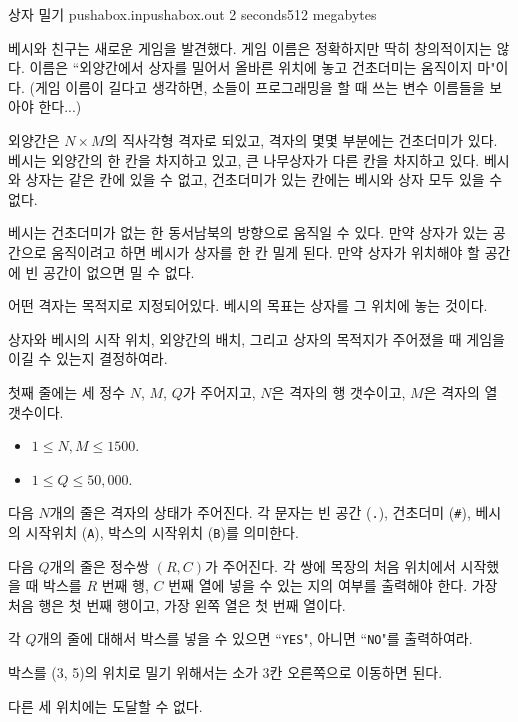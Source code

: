 \begin{problem}{상자 밀기}
	{pushabox.in}{pushabox.out}
	{2 seconds}{512 megabytes}{}
	
	베시와 친구는 새로운 게임을 발견했다. 게임 이름은 정확하지만 딱히 창의적이지는 않다. 이름은 ``외양간에서 상자를 밀어서 올바른 위치에 놓고 건초더미는 움직이지 마"이다. (게임 이름이 길다고 생각하면, 소들이 프로그래밍을 할 때 쓰는 변수 이름들을 보아야 한다...)
	
	외양간은 $N \times M$의 직사각형 격자로 되있고, 격자의 몇몇 부분에는 건초더미가 있다. 베시는 외양간의 한 칸을 차지하고 있고, 큰 나무상자가 다른 칸을 차지하고 있다. 베시와 상자는 같은 칸에 있을 수 없고, 건초더미가 있는 칸에는 베시와 상자 모두 있을 수 없다.
	
	베시는 건초더미가 없는 한 동서남북의 방향으로 움직일 수 있다. 만약 상자가 있는 공간으로 움직이려고 하면 베시가 상자를 한 칸 밀게 된다. 만약 상자가 위치해야 할 공간에 빈 공간이 없으면 밀 수 없다.
	
	어떤 격자는 목적지로 지정되어있다. 베시의 목표는 상자를 그 위치에 놓는 것이다.
	
	상자와 베시의 시작 위치, 외양간의 배치, 그리고 상자의 목적지가 주어졌을 때 게임을 이길 수 있는지 결정하여라.
	
	
	\InputFile
	
	첫째 줄에는 세 정수 $N$, $M$, $Q$가 주어지고, $N$은 격자의 행 갯수이고, $M$은 격자의 열 갯수이다.
	
	\begin{itemize}
		\item $1 \le N, M \le 1500$.
		\item $1 \le Q \le 50,000$.
	\end{itemize}
	
	다음 $N$개의 줄은 격자의 상태가 주어진다. 각 문자는 빈 공간 (\texttt{.}), 건초더미 (\texttt{\#}), 베시의 시작위치 (\texttt{A}), 박스의 시작위치 (\texttt{B})를 의미한다.
	
	다음 $Q$개의 줄은 정수쌍 $(R, C)$가 주어진다. 각 쌍에 목장의 처음 위치에서 시작했을 때 박스를 $R$ 번째 행, $C$ 번째 열에 넣을 수 있는 지의 여부를 출력해야 한다. 가장 처음 행은 첫 번째 행이고, 가장 왼쪽 열은 첫 번째 열이다.
	
	\OutputFile
	
	각 $Q$개의 줄에 대해서 박스를 넣을 수 있으면 ``\texttt{YES}", 아니면 ``\texttt{NO}"를 출력하여라.
	
	\Constraints
		
	\begin{example}
	\end{example}
	
	\Notes
	
	박스를 (3, 5)의 위치로 밀기 위해서는 소가 3칸 오른쪽으로 이동하면 된다.
	
	다른 세 위치에는 도달할 수 없다.
	
	
	
\end{problem}

